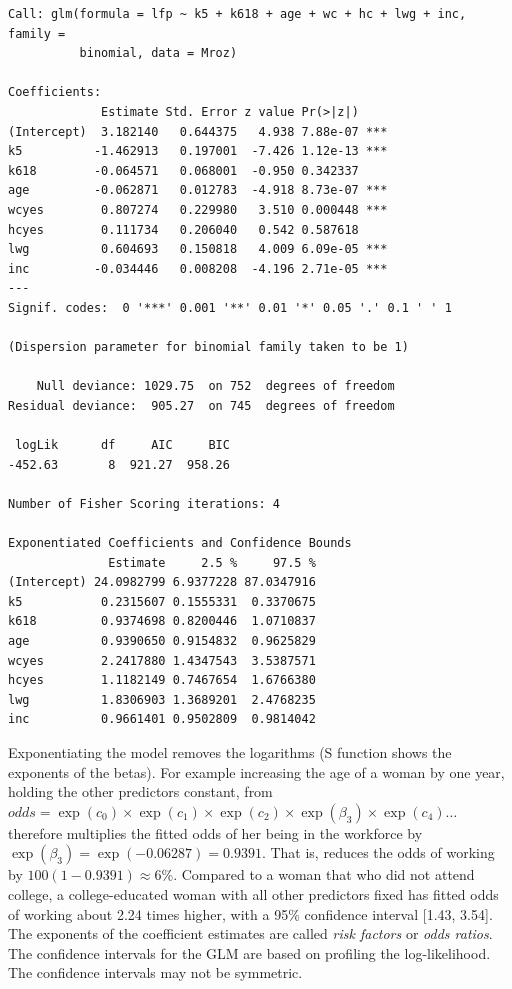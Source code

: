 \documentclass[
]{article}
\begin{document}
\begin{verbatim}
Call: glm(formula = lfp ~ k5 + k618 + age + wc + hc + lwg + inc, family =
          binomial, data = Mroz)

Coefficients:
             Estimate Std. Error z value Pr(>|z|)    
(Intercept)  3.182140   0.644375   4.938 7.88e-07 ***
k5          -1.462913   0.197001  -7.426 1.12e-13 ***
k618        -0.064571   0.068001  -0.950 0.342337    
age         -0.062871   0.012783  -4.918 8.73e-07 ***
wcyes        0.807274   0.229980   3.510 0.000448 ***
hcyes        0.111734   0.206040   0.542 0.587618    
lwg          0.604693   0.150818   4.009 6.09e-05 ***
inc         -0.034446   0.008208  -4.196 2.71e-05 ***
---
Signif. codes:  0 '***' 0.001 '**' 0.01 '*' 0.05 '.' 0.1 ' ' 1

(Dispersion parameter for binomial family taken to be 1)

    Null deviance: 1029.75  on 752  degrees of freedom
Residual deviance:  905.27  on 745  degrees of freedom

 logLik      df     AIC     BIC 
-452.63       8  921.27  958.26 

Number of Fisher Scoring iterations: 4

Exponentiated Coefficients and Confidence Bounds
              Estimate     2.5 %     97.5 %
(Intercept) 24.0982799 6.9377228 87.0347916
k5           0.2315607 0.1555331  0.3370675
k618         0.9374698 0.8200446  1.0710837
age          0.9390650 0.9154832  0.9625829
wcyes        2.2417880 1.4347543  3.5387571
hcyes        1.1182149 0.7467654  1.6766380
lwg          1.8306903 1.3689201  2.4768235
inc          0.9661401 0.9502809  0.9814042
\end{verbatim}

Exponentiating the model removes the logarithms (S function shows the
exponents of the betas). For example increasing the age of a woman by
one year, holding the other predictors constant, from
\(odds = \exp(c_0) \times \exp(c_1) \times \exp(c_2) \times \exp(\beta_3) \times \exp(c_4) \dots\)
therefore multiplies the fitted odds of her being in the workforce by
\(\exp(\beta_3) = \exp(-0.06287) = 0.9391\). That is, reduces the odds
of working by \(100(1-0.9391) \approx 6\%\). Compared to a woman that
who did not attend college, a college-educated woman with all other
predictors fixed has fitted odds of working about 2.24 times higher,
with a 95\% confidence interval {[}1.43, 3.54{]}. The exponents of the
coefficient estimates are called \emph{risk factors} or \emph{odds
ratios}. The confidence intervals for the GLM are based on profiling the
log-likelihood. The confidence intervals may not be symmetric.
\end{document}
